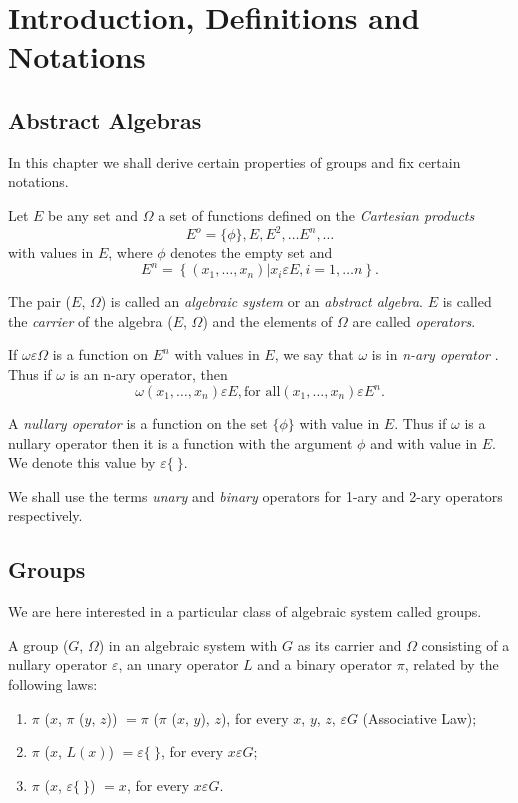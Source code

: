 
\chapter{Introduction, Definitions and Notations}

\section{Abstract Algebras} %

In this chapter we shall derive certain properties of groups and fix
certain notations. 

Let $E$ be any set and $\Omega$ a set of functions defined on the
\textit{Cartesian products} 
$$
E^o = \{\phi\}, E, E^2,  \ldots E^n,  \ldots
$$
with values in $E$, where $\phi$ denotes the empty set and 
$$
E^n = \left\{ (x_1,  \ldots,  x_n ) \big| x_i \varepsilon E, i=1, 
\ldots n \right\}. 
$$

The pair ($E$, $\Omega$) is called an \textit{algebraic system } or an
\textit{abstract algebra}. $E$ is called the \textit{carrier} of the
algebra ($E$, $\Omega$) and the elements of $\Omega$ are called
\textit{operators}. 

If $\omega \varepsilon \Omega$ is a function on $E^n$ with values in
$E$, we say that $\omega$ is in \textit{n-ary operator }. Thus if
$\omega$ is an n-ary operator, then 
$$
\omega (x_1, \ldots, x_n) \varepsilon E, \text{for all} (x_1,  \ldots
, x_n) \varepsilon E^n. 
$$

A \textit{nullary operator } is a function on the set $\{ \phi \}$
with value in $E$. Thus if $\omega$ is a nullary operator then it is a
function with the argument  $\phi$ and with value in $E$. We denote
this value by $\varepsilon \{~ \}$. 

We shall use the terms \textit{unary} and \textit{binary} operators
for 1-ary and 2-ary operators respectively. 

\section{Groups} %

We are here interested in a particular class of algebraic system
called groups. 
\begin{definition}
  A group ($G$, $\Omega$) in an algebraic system with $G$ as its
  carrier and $\Omega$ consisting of a nullary operator $\varepsilon$,
  an unary operator $L$ and a binary operator $\pi$, related by the
  following laws: 
  \begin{enumerate}[(1)]
  \item $\pi$ ($x$, $\pi$ ($y$, $z$)) $= \pi$ ($\pi$ ($x$, $y$), $z$),
    for every $x$, $y$, $z$, $\varepsilon G$ (Associative Law); 
  \item $\pi$ ($x$, $L (x)$) $= \varepsilon \{~ \}$, for every $x
    \varepsilon G$; 
  \item $\pi$ ($x$, $\varepsilon \{~\}$) $= x$, for every $x \varepsilon G$. 
  \end{enumerate}
\end{definition}

